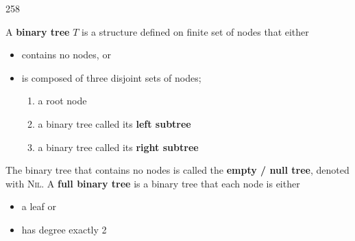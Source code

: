 258\documentclass[11pt]{article}
\begin{document}
\begin{defn*}
  A \textbf{binary tree} $T$ is a structure defined on finite set of nodes that either
  \begin{itemize}
    \item contains no nodes, or
    \item is composed of three disjoint sets of nodes;
    \begin{enumerate}
      \item a root node
      \item a binary tree called its \textbf{left subtree}
      \item a binary tree called its \textbf{right subtree}
    \end{enumerate}
  \end{itemize}
  The binary tree that contains no nodes is called the \textbf{empty / null tree}, denoted with \textsc{Nil}. A \textbf{full binary tree} is a binary tree that each node is either
  \begin{itemize}
    \item a leaf or
    \item has degree exactly 2
  \end{itemize}
\end{defn*}
\end{document}
